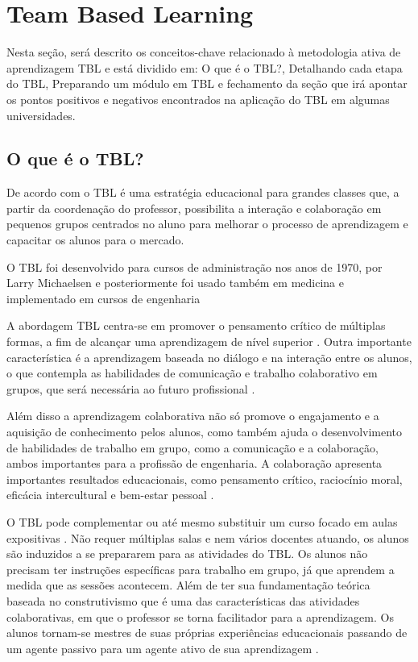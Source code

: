 \section{Team Based Learning}

Nesta seção, será descrito os conceitos-chave relacionado à metodologia ativa de aprendizagem TBL e está dividido em: O que é o TBL?, Detalhando cada etapa do TBL, Preparando um módulo em TBL e fechamento da seção que irá apontar os pontos positivos e negativos encontrados na aplicação do TBL em algumas universidades.

\subsection{O que é o TBL?}

De acordo com \cite{burgess} o TBL é uma estratégia educacional para grandes classes que, a partir da coordenação do professor, possibilita a interação e colaboração em pequenos grupos centrados no aluno para melhorar o processo de aprendizagem e capacitar os alunos para o mercado.

O TBL foi desenvolvido para cursos de administração nos anos de 1970, por Larry Michaelsen \cite{sweet} e posteriormente foi usado também em medicina e implementado em cursos de engenharia \cite{matalonga}

A abordagem TBL centra-se em promover o pensamento crítico de múltiplas formas, a fim de alcançar uma aprendizagem de nível superior \cite{gomez}. Outra importante característica é a aprendizagem baseada no diálogo e na interação entre os alunos, o que contempla as habilidades de comunicação e trabalho colaborativo em grupos, que será necessária ao futuro profissional \cite{bollela}.

Além disso a aprendizagem colaborativa não só  promove o engajamento e a aquisição de conhecimento pelos alunos, como também ajuda o desenvolvimento de habilidades de trabalho em grupo, como a comunicação e a colaboração, ambos importantes para a profissão de engenharia. A colaboração apresenta importantes resultados educacionais, como pensamento crítico, raciocínio moral, eficácia intercultural e bem-estar pessoal \cite{cabrera}.

O TBL pode complementar ou até mesmo substituir um curso focado em aulas expositivas \cite{dean}. Não requer múltiplas salas e nem vários docentes atuando, os alunos são induzidos a se prepararem para as atividades do TBL. Os alunos não precisam ter instruções específicas para trabalho em grupo, já que aprendem a medida que as sessões acontecem. Além de ter sua fundamentação teórica baseada no construtivismo que é uma das características das atividades colaborativas, em que o professor se torna facilitador para a aprendizagem. Os alunos tornam-se mestres de suas próprias experiências educacionais passando de um agente passivo para um agente ativo de sua aprendizagem \cite{bollela}.

